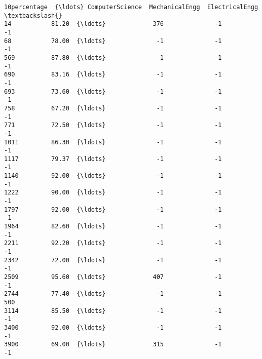 \documentclass[11pt]{article}
\begin{document}
\begin{tcolorbox}[breakable, size=fbox, boxrule=.5pt, pad at break*=1mm, opacityfill=0]
\begin{Verbatim}[commandchars=\\\{\}]
      10percentage  {\ldots} ComputerScience  MechanicalEngg  ElectricalEngg  \textbackslash{}
14           81.20  {\ldots}             376              -1              -1
68           78.00  {\ldots}              -1              -1              -1
569          87.80  {\ldots}              -1              -1              -1
690          83.16  {\ldots}              -1              -1              -1
693          73.60  {\ldots}              -1              -1              -1
758          67.20  {\ldots}              -1              -1              -1
771          72.50  {\ldots}              -1              -1              -1
1011         86.30  {\ldots}              -1              -1              -1
1117         79.37  {\ldots}              -1              -1              -1
1140         92.00  {\ldots}              -1              -1              -1
1222         90.00  {\ldots}              -1              -1              -1
1797         92.00  {\ldots}              -1              -1              -1
1964         82.60  {\ldots}              -1              -1              -1
2211         92.20  {\ldots}              -1              -1              -1
2342         72.00  {\ldots}              -1              -1              -1
2509         95.60  {\ldots}             407              -1              -1
2744         77.40  {\ldots}              -1              -1             500
3114         85.50  {\ldots}              -1              -1              -1
3400         92.00  {\ldots}              -1              -1              -1
3900         69.00  {\ldots}             315              -1              -1


\end{Verbatim}
\end{tcolorbox}
\end{document}
